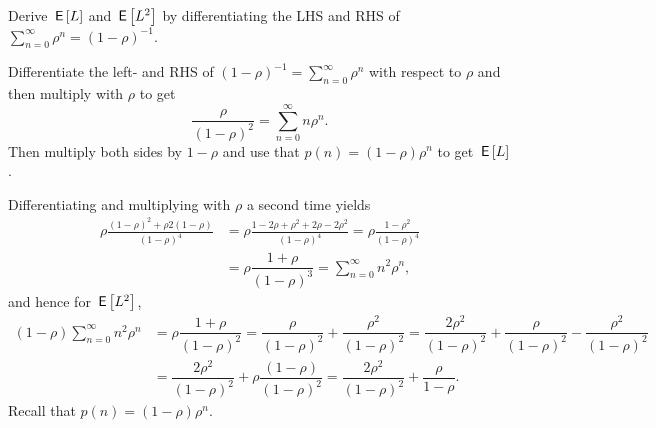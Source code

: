 \begin{exercise}
Derive $\,\mathsf{E}\left[L\right]$ and $\,\mathsf{E}\left[L^2\right]$  by differentiating the  LHS and RHS of $\sum_{n=0}^{\infty}\rho^n = (1-\rho)^{-1}$.
\begin{solution}
  Differentiate the left- and RHS of $(1-\rho)^{-1} = \sum_{n=0}^\infty \rho^n$ with respect to $\rho$ and then multiply with $\rho$ to get
\begin{equation*}
\dfrac{\rho}{(1-\rho)^2}=\sum_{n=0}^{\infty}n\rho^n.
\end{equation*}
Then multiply both sides by $1-\rho$ and use that $p(n) = (1-\rho)\rho^n$ to get $\,\mathsf{E}\left[L\right]$.

Differentiating and multiplying with $\rho$ a second time yields
\begin{align*}
\rho \frac{(1-\rho)^2 + \rho2(1-\rho)}{(1-\rho)^4} &= \rho \frac{1-2\rho+\rho^2 + 2\rho-2\rho^2}{(1-\rho)^4}
                                                     = \rho \frac{1-\rho^2}{(1-\rho)^4} \\
  &=\rho \dfrac{1+\rho}{(1-\rho)^3}=\sum_{n=0}^{\infty}n^2\rho^n,
\end{align*}
and hence for $\,\mathsf{E}\left[L^2\right]$,
\begin{align*}
  (1-\rho)\sum_{n=0}^{\infty}n^2\rho^n
  &= \rho\dfrac{1+\rho}{(1-\rho)^2}  = \dfrac{\rho}{(1-\rho)^2} + \dfrac{\rho^2}{(1-\rho)^2}
    = \dfrac{2\rho^2}{(1-\rho)^2} + \dfrac{\rho}{(1-\rho)^2} - \dfrac{\rho^2}{(1-\rho)^2} \\
  &= \dfrac{2\rho^2}{(1-\rho)^2} + \rho\dfrac{(1-\rho)}{(1-\rho)^2} = \dfrac{2\rho^2}{(1-\rho)^2} + \dfrac{\rho}{1-\rho}.
\end{align*}
Recall that $p(n) = (1-\rho)\rho^n$.
\end{solution}
\end{exercise}




